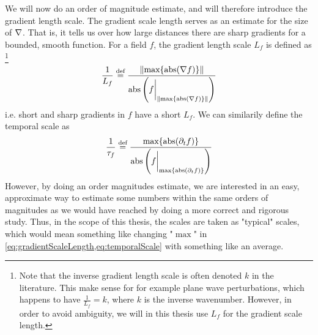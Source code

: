 %
We will now do an order of magnitude estimate, and will therefore introduce the gradient length scale.
The gradient scale length serves as an estimate for the size of $\nabla$.
That is, it tells us over how large distances there are sharp gradients for a bounded, smooth function.
For a field $f$, the gradient length scale $L_f$ is defined as%
\footnote{
    Note that the inverse gradient length scale is often denoted $k$ in the literature.
    This make sense for for example plane wave perturbations, which happens to have $\frac{1}{L_f}=k$, where $k$ is the inverse wavenumber.
    However, in order to avoid ambiguity, we will in this thesis use $L_f$ for the gradient scale length.
}%
%
\begin{align}
    \frac{1}{L_f} \overset{\text{def}}{=} \frac{\|\text{max}\{\operatorname{abs}(\nabla f)\}\|}{\operatorname{abs}\left(f\bigg|_{\|\text{max}\{\operatorname{abs}(\nabla f)\}\|}\right)}
    \label{eq:gradientScaleLength}
\end{align}
%
i.e. short and sharp gradients in $f$ have a short $L_f$.
We can similarily define the temporal scale as
%
\begin{align}
    \frac{1}{\tau_f} \overset{\text{def}}{=} \frac{\text{max}\{\operatorname{abs}(\partial_t f)\}}{\operatorname{abs}\left(f\bigg|_{\text{max}\{\operatorname{abs}(\partial_t f)\}}\right)}
    \label{eq:temporalScale}
\end{align}
%
However, by doing an order magnitudes estimate, we are interested in an easy, approximate way to estimate some numbers within the same orders of magnitudes as we would have reached by doing a more correct and rigorous study.
Thus, in the scope of this thesis, the scales are taken as "typical" scales, which would mean something like changing "$\max$" in \cref{eq:gradientScaleLength,eq:temporalScale} with something like an average.

